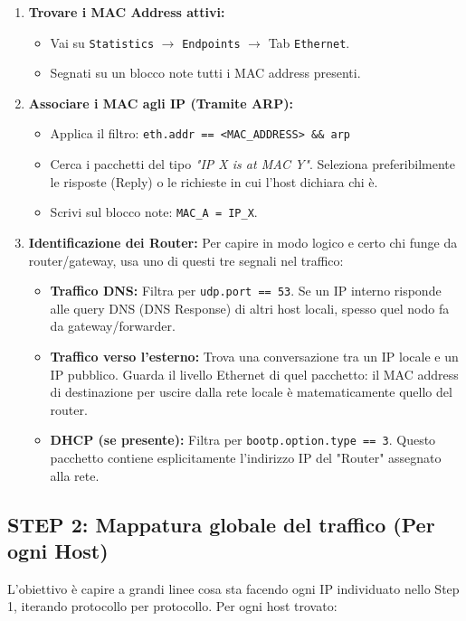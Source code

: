 \documentclass[12pt,a4paper]{report}
\begin{document}
	\begin{enumerate}
		\item \textbf{Trovare i MAC Address attivi:}
		\begin{itemize}
			\item Vai su \texttt{Statistics} $\rightarrow$ \texttt{Endpoints} $\rightarrow$ Tab \texttt{Ethernet}.
			\item Segnati su un blocco note tutti i MAC address presenti.
		\end{itemize}
		\item \textbf{Associare i MAC agli IP (Tramite ARP):}
		\begin{itemize}
			\item Applica il filtro: \texttt{eth.addr == <MAC\_ADDRESS> \&\& arp}
			\item Cerca i pacchetti del tipo \textit{"IP X is at MAC Y"}. Seleziona preferibilmente le risposte (Reply) o le richieste in cui l'host dichiara chi è. 
			\item Scrivi sul blocco note: \texttt{MAC\_A = IP\_X}.
		\end{itemize}
		\item \textbf{Identificazione dei Router:}
		Per capire in modo logico e certo chi funge da router/gateway, usa uno di questi tre segnali nel traffico:
		\begin{itemize}
			\item \textbf{Traffico DNS:} Filtra per \texttt{udp.port == 53}. Se un IP interno risponde alle query DNS (DNS Response) di altri host locali, spesso quel nodo fa da gateway/forwarder.
			\item \textbf{Traffico verso l'esterno:} Trova una conversazione tra un IP locale e un IP pubblico. Guarda il livello Ethernet di quel pacchetto: il MAC address di destinazione per uscire dalla rete locale è matematicamente quello del router.
			\item \textbf{DHCP (se presente):} Filtra per \texttt{bootp.option.type == 3}. Questo pacchetto contiene esplicitamente l'indirizzo IP del "Router" assegnato alla rete.
		\end{itemize}
	\end{enumerate}
	
	\subsection{STEP 2: Mappatura globale del traffico (Per ogni Host)}
	L'obiettivo è capire a grandi linee cosa sta facendo ogni IP individuato nello Step 1, iterando protocollo per protocollo.
	Per ogni host trovato:
	
\end{document}

